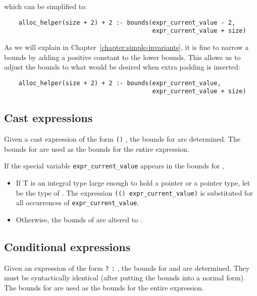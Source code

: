 which can be simplified to:

\begin{verbatim}
    alloc_helper(size + 2) + 2 :- bounds(expr_current_value - 2, 
                                         expr_current_value + size)
\end{verbatim}

As we will explain in Chapter~\ref{chapter:simple-invariants}, 
it is fine to narrow a bounds by
adding a positive constant to the lower bounds. This allows us to adjust
the bounds to what would be desired when extra padding is inserted:

\begin{verbatim}
    alloc_helper(size + 2) + 2 :- bounds(expr_current_value, 
                                         expr_current_value + size)
\end{verbatim}

\subsection{Cast expressions}\label{cast-expressions}

Given a cast expression of the form \texttt{()} ,
the bounds for  are determined. The bounds for
 are used as the bounds for the entire expression.

If the special variable \texttt{expr\_current\_value} appears in the
bounds for ,

\begin{itemize}
\item
  If T is an integral type large enough to hold a pointer or a pointer
  type, let  be the type of . The expression
  \texttt{(() expr\_current\_value)} is substituted for
  all occurrences of \texttt{expr\_current\_value}.
\item
  Otherwise, the bounds of  are  altered to \boundsnone.
\end{itemize}
  
\subsection{Conditional expressions}\label{conditional-expressions}

Given an expression of the form  \texttt{?} 
\texttt{:} , the bounds for  and  are
determined. They must be syntactically identical (after putting the
bounds into a normal form). The bounds for  are used as the
bounds for the entire expression.


